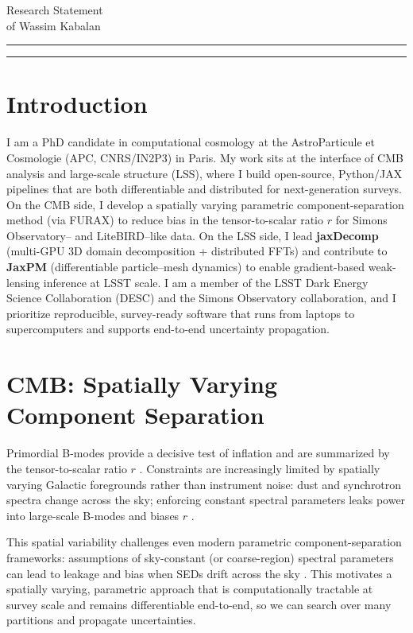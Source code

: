 \documentclass{article}
\newcommand{\soptitle}{Research Statement}
\newcommand{\yourname}{Wassim Kabalan}
\begin{document}
\begin{center}
  {\LARGE \soptitle}\\[4pt]
  {\large of \yourname}
\end{center}

\hrule
\vspace{1pt}
\hrule height 1pt
\bigskip

\section*{Introduction}
I am a PhD candidate in computational cosmology at the AstroParticule et Cosmologie (APC, CNRS/IN2P3) in Paris. My work sits at the interface of CMB analysis and large-scale structure (LSS), where I build open-source, Python/JAX pipelines that are both differentiable and distributed for next-generation surveys. On the CMB side, I develop a spatially varying parametric component-separation method (via FURAX) to reduce bias in the tensor-to-scalar ratio \(r\) for Simons Observatory– and LiteBIRD–like data. On the LSS side, I lead \textbf{jaxDecomp} (multi-GPU 3D domain decomposition + distributed FFTs) and contribute to \textbf{JaxPM} (differentiable particle–mesh dynamics) to enable gradient-based weak-lensing inference at LSST scale. I am a member of the LSST Dark Energy Science Collaboration (DESC) and the Simons Observatory collaboration, and I prioritize reproducible, survey-ready software that runs from laptops to supercomputers and supports end-to-end uncertainty propagation.

\section*{CMB: Spatially Varying Component Separation}
Primordial B-modes provide a decisive test of inflation and are summarized by the tensor-to-scalar ratio \(r\) \citep{Kamionkowski2016}. Constraints are increasingly limited by spatially varying Galactic foregrounds rather than instrument noise: dust and synchrotron spectra change across the sky; enforcing constant spectral parameters leaks power into large-scale B-modes and biases \(r\) \citep{Planck2018IV}.

This spatial variability challenges even modern parametric component-separation frameworks: assumptions of sky-constant (or coarse-region) spectral parameters can lead to leakage and bias when SEDs drift across the sky \citep{Planck2018IV,FGBusterASCL}. This motivates a spatially varying, parametric approach that is computationally tractable at survey scale and remains differentiable end-to-end, so we can search over many partitions and propagate uncertainties.
\end{document}
